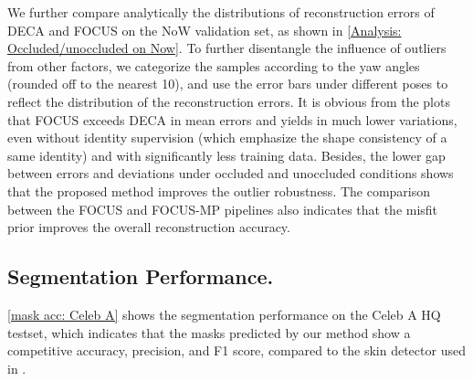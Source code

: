 \documentclass[10pt,twocolumn,letterpaper]{article}
\begin{document}
We further compare analytically the distributions of reconstruction errors of DECA \cite{DECA} and FOCUS on the NoW validation set, as shown in \cref{Analysis: Occluded/unoccluded on Now}. To further disentangle the influence of outliers from other factors, we categorize the samples according to the yaw angles (rounded off to the nearest 10), and use the error bars under different poses to reflect the distribution of the reconstruction errors. It is obvious from the plots that FOCUS exceeds DECA in mean errors and yields in much lower variations, even without identity supervision (which emphasize the shape consistency of a same identity) and with significantly less training data. Besides, the lower gap between errors and deviations under occluded and unoccluded conditions shows that the proposed method improves the outlier robustness. The comparison between the FOCUS and FOCUS-MP pipelines also indicates that the misfit prior improves the overall reconstruction accuracy.



\subsection{Segmentation Performance.}

\cref{mask acc: Celeb A} shows the segmentation performance on the Celeb A HQ testset, which indicates that the masks predicted by our method show a competitive accuracy, precision, and F1 score, compared to the skin detector used in \cite{deng2019accurate}. 


 \begin{table*}
  \caption{Evaluation of occlusion segmentation accuracy on the CelebA-HQ testsets.}
  \label{mask acc: Celeb A}
  \centering
  \end{table*}
\end{document}
